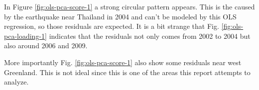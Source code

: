 In Figure \ref{fig:ols-pca-score-1} a strong circular pattern appears. This is the caused by the earthquake near Thailand in 2004 and can't be modeled by this OLS regression, so those residuals are expected. It is a bit strange that Fig. \ref{fig:ols-pca-loading-1} indicates that the residuals not only comes from 2002 to 2004 but also around 2006 and 2009.

More importantly Fig. \ref{fig:ols-pca-score-1} also show some residuals near west Greenland. This is not ideal since this is one of the areas this report attempts to analyze.
